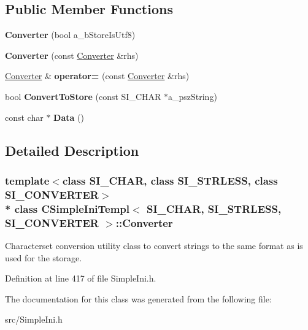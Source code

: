 \subsection*{Public Member Functions}
\begin{DoxyCompactItemize}
\item 
{\bfseries Converter} (bool a\+\_\+b\+Store\+Is\+Utf8)\hypertarget{class_c_simple_ini_templ_1_1_converter_ab8e740b211e4ece127d4d25773ba7e42}{}\label{class_c_simple_ini_templ_1_1_converter_ab8e740b211e4ece127d4d25773ba7e42}

\item 
{\bfseries Converter} (const \hyperlink{class_c_simple_ini_templ_1_1_converter}{Converter} \&rhs)\hypertarget{class_c_simple_ini_templ_1_1_converter_a2f6e993014ed5d60c6e890e55beb0805}{}\label{class_c_simple_ini_templ_1_1_converter_a2f6e993014ed5d60c6e890e55beb0805}

\item 
\hyperlink{class_c_simple_ini_templ_1_1_converter}{Converter} \& {\bfseries operator=} (const \hyperlink{class_c_simple_ini_templ_1_1_converter}{Converter} \&rhs)\hypertarget{class_c_simple_ini_templ_1_1_converter_af858c01c6a7e4ce9fafd18abc9e0ac1b}{}\label{class_c_simple_ini_templ_1_1_converter_af858c01c6a7e4ce9fafd18abc9e0ac1b}

\item 
bool {\bfseries Convert\+To\+Store} (const S\+I\+\_\+\+C\+H\+AR $\ast$a\+\_\+psz\+String)\hypertarget{class_c_simple_ini_templ_1_1_converter_a4e4186867214b54326cf622e323c9f2f}{}\label{class_c_simple_ini_templ_1_1_converter_a4e4186867214b54326cf622e323c9f2f}

\item 
const char $\ast$ {\bfseries Data} ()\hypertarget{class_c_simple_ini_templ_1_1_converter_a918bbd4f861a2872e148bc9481ac80bb}{}\label{class_c_simple_ini_templ_1_1_converter_a918bbd4f861a2872e148bc9481ac80bb}

\end{DoxyCompactItemize}


\subsection{Detailed Description}
\subsubsection*{template$<$class S\+I\+\_\+\+C\+H\+AR, class S\+I\+\_\+\+S\+T\+R\+L\+E\+SS, class S\+I\+\_\+\+C\+O\+N\+V\+E\+R\+T\+ER$>$\\*
class C\+Simple\+Ini\+Templ$<$ S\+I\+\_\+\+C\+H\+A\+R, S\+I\+\_\+\+S\+T\+R\+L\+E\+S\+S, S\+I\+\_\+\+C\+O\+N\+V\+E\+R\+T\+E\+R $>$\+::\+Converter}

Characterset conversion utility class to convert strings to the same format as is used for the storage. 

Definition at line 417 of file Simple\+Ini.\+h.



The documentation for this class was generated from the following file\+:\begin{DoxyCompactItemize}
\item 
src/Simple\+Ini.\+h\end{DoxyCompactItemize}
